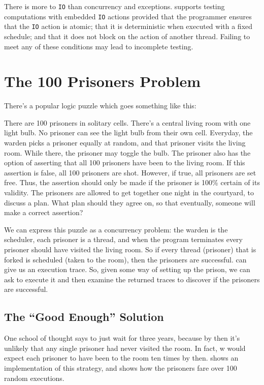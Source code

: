 There is more to \verb|IO| than concurrency and exceptions.  \dejafu{} supports
testing computations with embedded \verb|IO| actions provided that the
programmer ensures that the \verb|IO| action is atomic; that it is deterministic
when executed with a fixed schedule; and that it does not block on the action of
another thread.  Failing to meet any of these conditions may lead to incomplete
testing.

\section{The 100 Prisoners Problem}
\label{sec:dejafu-100}

There's a popular logic puzzle which goes something like this:

\begin{displayquote}
  There are 100 prisoners in solitary cells.  There's a central living
  room with one light bulb.  No prisoner can see the light bulb from
  their own cell.  Everyday, the warden picks a prisoner equally at
  random, and that prisoner visits the living room.  While there, the
  prisoner may toggle the bulb.  The prisoner also has the option of
  asserting that all 100 prisoners have been to the living room.  If
  this assertion is false, all 100 prisoners are shot.  However, if
  true, all prisoners are set free.  Thus, the assertion should only
  be made if the prisoner is 100\% certain of its validity.  The
  prisoners are allowed to get together one night in the courtyard, to
  discuss a plan.  What plan should they agree on, so that eventually,
  someone will make a correct assertion?
\end{displayquote}

We can express this puzzle as a concurrency problem: the warden is the
scheduler, each prisoner is a thread, and when the program terminates
every prisoner should have visited the living room.  So if every
thread (prisoner) that is forked is scheduled (taken to the room),
then the prisoners are successful.  \dejafu{} can give us an execution
trace.  So, given some way of setting up the prison, we can ask
\dejafu{} to execute it and then examine the returned traces to
discover if the prisoners are successful.

\subsection{The ``Good Enough'' Solution}

One school of thought says to just wait for three years, because by
then it's unlikely that any single prisoner had never visited the
room.  In fact, w would expect each prisoner to have been to the room
ten times by then.   shows an implementation of this
strategy, and  shows how the prisoners fare over 100
random executions.

